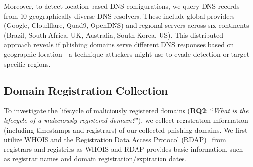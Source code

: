 Moreover, to detect location-based DNS configurations, we query DNS records from 10 geographically diverse DNS resolvers. These include global providers (Google, Cloudflare, Quad9, OpenDNS) and regional servers across six continents (Brazil, South Africa, UK, Australia, South Korea, US). This distributed approach reveals if phishing domains serve different DNS responses based on geographic location—a technique attackers might use to evade detection or target specific regions.
\vspace{-10px}


\subsection{Domain Registration Collection}
\label{sec:domain_registration_collection}
To investigate the lifecycle of maliciously registered domains (\textbf{RQ2:} ``\textit{What is the lifecycle of a maliciously registered domain?}''), we collect registration information (including timestamps and registrars) of our collected phishing domains.
We first utilize WHOIS and the Registration Data Access Protocol (RDAP)~\cite{RDAPORG31:online} from registrars and registries as WHOIS and RDAP provides basic information, such as registrar names and domain registration/expiration dates.



